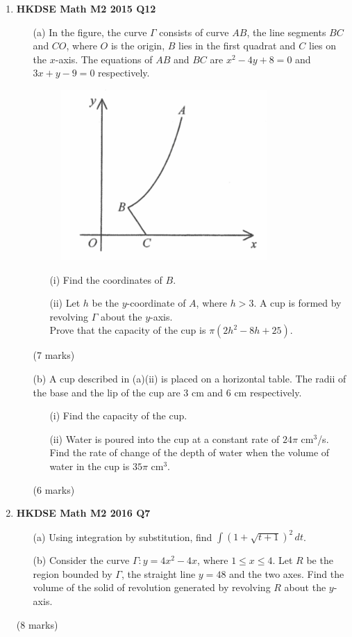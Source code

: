 \documentclass{report}
\begin{document}
\begin{enumerate}
	\item \textbf{HKDSE Math M2 2015 Q12}
	\begin{enumerate}
		\item [(a)]In the figure, the curve $\Gamma$ consists of curve $AB$, the line segments $BC$ and $CO$, where $O$ is the origin, $B$ lies in the first quadrat and $C$ lies on the $x$-axis. The equations of $AB$ and $BC$ are $x^2-4y+8 = 0$ and $3x+y-9=0$ respectively.
			\begin{figure}[H]
				\centering
				\includegraphics[width = .3\linewidth]{2015Figure1}
			\end{figure}
		\begin{enumerate}
			\item [(i)]Find the coordinates of $B$. 
			\item [(ii)]Let $h$ be the $y$-coordinate of $A$, where $h > 3$. A cup is formed by revolving $\Gamma$ about the $y$-axis.\\
			Prove that the capacity of the cup is $\pi(2h^2-8h+25)$.
		\end{enumerate}
		(7 marks)
		\item [(b)]A cup described in (a)(ii) is placed on a horizontal table. The radii of the base and the lip of the cup are 3 cm and 6 cm respectively.
		\begin{enumerate}
			\item [(i)]Find the capacity of the cup.
			\item [(ii)]Water is poured into the cup at a constant rate of $24\pi$ cm$^3$/s. Find the rate of change of the depth of water when the volume of water in the cup is $35\pi$ cm$^3$.
		\end{enumerate}
		(6 marks)
	\end{enumerate}

	\item \textbf{HKDSE Math M2 2016 Q7}
	\begin{enumerate}
		\item [(a)]Using integration by substitution, find $\displaystyle\int (1+\sqrt{t+1})^2 \,dt$. 
		\item [(b)]Consider the curve $\Gamma : y = 4x^2 - 4x$, where $1 \leq x \leq 4$. Let $R$ be the region bounded by $\Gamma$, the straight line $y=48$ and the two axes. Find the volume of the solid of revolution generated by revolving $R$ about the $y$-axis.
	\end{enumerate}
	(8 marks)
	

\end{enumerate}
\end{document}
